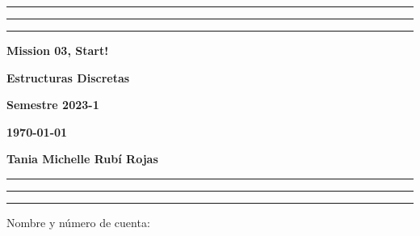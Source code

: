 \documentclass[12pt, a4paper]{exam}
\begin{document}
    \centering
    \hrule \hrule \hrule 
    \vspace{5mm}
    \begin{minipage}[c]{0.8\textwidth}
        \begin{center}
            {\large\textbf{Mission 03, Start!} \par
            \large \textbf{Estructuras Discretas} \par
            \large \textbf{Semestre 2023-1} \par
            \large \textbf{\today}	\par}
        \end{center}
    \end{minipage}

    \vspace{0.2in}
    \noindent
    \textbf{Tania Michelle Rubí Rojas}
    \vspace{2mm}
    \hrule \hrule \hrule 

    \vspace{5mm}
    \noindent
    Nombre y número de cuenta: \hrulefill\

    \vspace{5mm}
    \noindent
    
\end{document}
